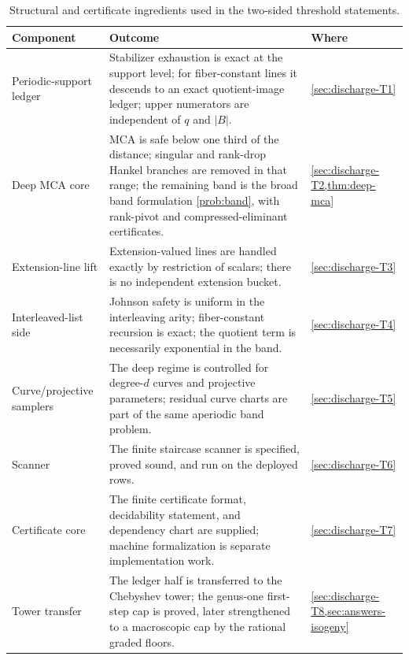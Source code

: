 \documentclass[11pt]{article}
\theoremstyle{definition}
\theoremstyle{remark}
\newcommand{\B}{B}
\begin{document}
\begin{table}[ht]
\centering
\small
\begin{tabular}{@{}p{2.7cm}p{7.9cm}l@{}}
\toprule
Component & Outcome & Where \\
\midrule
Periodic-support ledger & Stabilizer exhaustion is exact at the support level; for fiber-constant lines it descends to an exact quotient-image ledger; upper numerators are independent of $q$ and $|\B|$. & \cref{sec:discharge-T1} \\
Deep MCA core & MCA is safe below one third of the distance; singular and rank-drop Hankel branches are removed in that range; the remaining band is the broad band formulation \cref{prob:band}, with rank-pivot and compressed-eliminant certificates. & \cref{sec:discharge-T2,thm:deep-mca} \\
Extension-line lift & Extension-valued lines are handled exactly by restriction of scalars; there is no independent extension bucket. & \cref{sec:discharge-T3} \\
Interleaved-list side & Johnson safety is uniform in the interleaving arity; fiber-constant recursion is exact; the quotient term is necessarily exponential in the band. & \cref{sec:discharge-T4} \\
Curve/projective samplers & The deep regime is controlled for degree-$d$ curves and projective parameters; residual curve charts are part of the same aperiodic band problem. & \cref{sec:discharge-T5} \\
Scanner & The finite staircase scanner is specified, proved sound, and run on the deployed rows. & \cref{sec:discharge-T6} \\
Certificate core & The finite certificate format, decidability statement, and dependency chart are supplied; machine formalization is separate implementation work. & \cref{sec:discharge-T7} \\
Tower transfer & The ledger half is transferred to the Chebyshev tower; the genus-one first-step cap is proved, later strengthened to a macroscopic cap by the rational graded floors. & \cref{sec:discharge-T8,sec:answers-isogeny} \\
\bottomrule
\end{tabular}
\caption{Structural and certificate ingredients used in the two-sided threshold statements.}
\label{tab:status}
\end{table}
\end{document}
